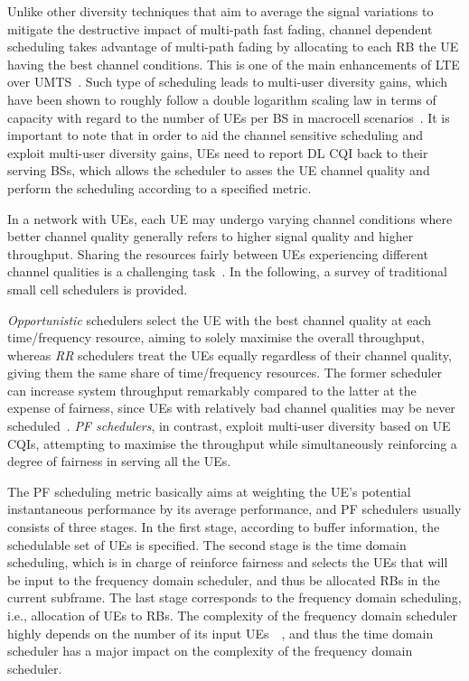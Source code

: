 \documentclass{IEEEtran}
\begin{document}
Unlike other diversity techniques that aim to average the signal variations to mitigate the destructive impact of multi-path fast fading,
channel dependent scheduling takes advantage of multi-path fading
by allocating to each \ac{RB} the \ac{UE} having the best channel conditions.
This is one of the main enhancements of \ac{LTE} over \ac{UMTS}~\cite{Sesia2009}.
Such type of scheduling leads to multi-user diversity gains,
which have been shown to roughly follow a double logarithm scaling law in terms of capacity with regard to the number of \acp{UE} per \ac{BS}
in macrocell scenarios~\cite{4063519}.
It is important to note that in order to aid the channel sensitive scheduling and exploit multi-user diversity gains,
\acp{UE} need to report \ac{DL} \ac{CQI} back to their serving \acp{BS},
which allows the scheduler to asses the \ac{UE} channel quality and perform the scheduling according to a specified metric.

In a network with  \acp{UE},
each \ac{UE} may undergo varying channel conditions
where better channel quality generally refers to higher signal quality and higher throughput.
Sharing the resources fairly between \acp{UE} experiencing different channel qualities is a challenging task~\cite{4146798}.
In the following, a survey of traditional small cell schedulers is provided.

\emph{Opportunistic} schedulers select the \ac{UE} with the best channel quality at each time/frequency resource,
aiming to solely maximise the overall throughput,
whereas \emph{\ac{RR}} schedulers treat the \acp{UE} equally regardless of their channel quality,
giving them the same share of time/frequency resources.
The former scheduler can increase system throughput remarkably compared to the latter at the expense of fairness,
since \acp{UE} with relatively bad channel qualities may be never scheduled~\cite{4489366}.
\emph{\ac{PF} schedulers}, in contrast, exploit multi-user diversity based on \ac{UE} \acp{CQI},
attempting to maximise the throughput while simultaneously reinforcing a degree of fairness in serving all the \acp{UE}.

The \ac{PF} scheduling metric basically aims at weighting the UE's potential instantaneous performance by its average performance,
and \ac{PF} schedulers usually consists of three stages.
In the first stage, according to buffer information,
the schedulable set of \acp{UE} is specified.
The second stage is the time domain scheduling,
which is in charge of reinforce fairness and selects the  \acp{UE} that will be input to the frequency domain scheduler,
and thus be allocated \acp{RB} in the current subframe.
The last stage corresponds to the frequency domain scheduling,
i.e., allocation of \acp{UE} to \acp{RB}.
The complexity of the frequency domain scheduler highly depends on the number of its input \acp{UE}~\cite{4526113}~\cite{851593},
and thus the time domain scheduler has a major impact on the complexity of the frequency domain scheduler.
\end{document}
